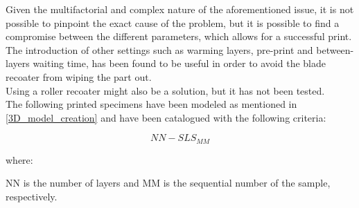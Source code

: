 \documentclass{article}
\begin{document}
        Given the multifactorial and complex nature of the aforementioned issue, it is not possible to 
        pinpoint the exact cause of the problem, but it is possible to find a compromise between the 
        different parameters, which allows for a successful print. \\
        
        The introduction of other settings such as warming layers, pre-print 
        and between-layers waiting time, has been found to be useful in order to avoid 
        the blade recoater from wiping the part out. \\

        Using a roller recoater might also be a solution, but it has not been tested. \\ 

        The following printed specimens have been modeled as mentioned in \ref{3D_model_creation} and 
        have been catalogued with the following criteria: 

        \begin{equation}
            NN-SLS_{MM}
            \label{eq:SLS_specimen_notation}
        \end{equation}

        where: 

        NN is the number of layers and MM is the sequential number of the sample, respectively. \\ 
\end{document}
